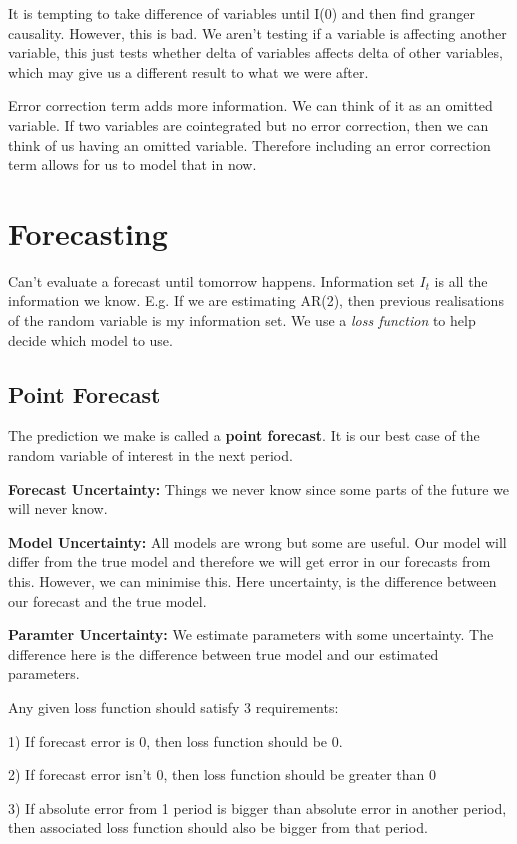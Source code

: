 \documentclass[11pt, oneside]{article}
\theoremstyle{definition}
\begin{document}
It is tempting to take difference of variables until I(0) and then find granger causality. However, this is bad. We aren't testing if a variable is affecting another variable, this just tests whether delta of variables affects delta of other variables, which may give us a different result to what we were after.

Error correction term adds more information. We can think of it as an omitted variable. If two variables are cointegrated but no error correction, then we can think of us having an omitted variable. Therefore including an error correction term allows for us to model that in now.
\newpage
\section{Forecasting}
Can't evaluate a forecast until tomorrow happens. Information set $I_t$ is all the information we know. E.g. If we are estimating AR(2), then previous realisations of the random variable is my information set. We use a \textit{loss function} to help decide which model to use.

\subsection{Point Forecast}
The prediction we make is called a \textbf{point forecast}. It is our best case of the random variable of interest in the next period.

\textbf{Forecast Uncertainty:} Things we never know since some parts of the future we will never know.

\textbf{Model Uncertainty:} All models are wrong but some are useful. Our model will differ from the true model and therefore we will get error in our forecasts from this. However, we can minimise this. Here uncertainty, is the difference between our forecast and the true model.

\textbf{Paramter Uncertainty:} We estimate parameters with some uncertainty. The difference here is the difference between true model and our estimated parameters.

Any given loss function should satisfy 3 requirements:

1) If forecast error is 0, then loss function should be 0.

2) If forecast error isn't 0, then loss function should be greater than 0

3) If absolute error from 1 period is bigger than absolute error in another period, then associated loss function should also be bigger from that period.
\end{document}
